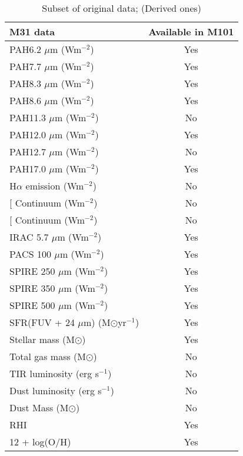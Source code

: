 \begin{table}
\centering
\caption{Subset of original data; (Derived ones)}
\label{tab: derived_ones}
\begin{tabular}{ |l|c| }
\hline\hline
M31 data           & Available in M101 \\
\hline\hline
PAH6.2 $\mu$m (Wm$^{-2}$)  & Yes\\
PAH7.7 $\mu$m (Wm$^{-2}$)  & Yes\\
PAH8.3 $\mu$m (Wm$^{-2}$)  & Yes\\
PAH8.6 $\mu$m (Wm$^{-2}$)  & Yes\\
PAH11.3 $\mu$m (Wm$^{-2}$) & No \\
PAH12.0 $\mu$m (Wm$^{-2}$) & Yes\\
PAH12.7 $\mu$m (Wm$^{-2}$) & No \\
PAH17.0 $\mu$m (Wm$^{-2}$) &Yes \\
H$\alpha$ emission (Wm$^{-2}$) & No\\
{[}\sii{]} Continuum (Wm$^{-2}$) & No \\
{[}\oiii{]} Continuum (Wm$^{-2}$) & No \\
IRAC 5.7 $\mu$m (Wm$^{-2}$)& Yes\\
PACS 100 $\mu$m (Wm$^{-2}$)& Yes\\
SPIRE 250 $\mu$m (Wm$^{-2}$)& Yes\\
SPIRE 350 $\mu$m (Wm$^{-2}$)& Yes\\
SPIRE 500 $\mu$m (Wm$^{-2}$)& Yes\\
SFR(FUV + 24 $\mu$m) (M$\odot$yr$^{-1}$) & Yes\\
Stellar mass  (M$\odot$)& Yes\\
Total gas mass (M$\odot$) & No \\
TIR luminosity (erg s$^{-1}$) & No \\
Dust luminosity (erg s$^{-1}$) & No \\
Dust Mass (M$\odot$)& No\\
RHI & Yes\\
12 + log(O/H)& Yes\\
\hline
\end{tabular}
\end{table}